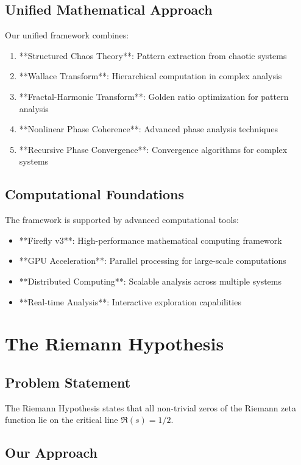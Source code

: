 \documentclass[12pt]{article}
\begin{document}
\subsection{Unified Mathematical Approach}

Our unified framework combines:
\begin{enumerate}
    \item **Structured Chaos Theory**: Pattern extraction from chaotic systems
    \item **Wallace Transform**: Hierarchical computation in complex analysis
    \item **Fractal-Harmonic Transform**: Golden ratio optimization for pattern analysis
    \item **Nonlinear Phase Coherence**: Advanced phase analysis techniques
    \item **Recursive Phase Convergence**: Convergence algorithms for complex systems
\end{enumerate}

\subsection{Computational Foundations}

The framework is supported by advanced computational tools:
\begin{itemize}
    \item **Firefly v3**: High-performance mathematical computing framework
    \item **GPU Acceleration**: Parallel processing for large-scale computations
    \item **Distributed Computing**: Scalable analysis across multiple systems
    \item **Real-time Analysis**: Interactive exploration capabilities
\end{itemize}

\section{The Riemann Hypothesis}

\subsection{Problem Statement}
The Riemann Hypothesis states that all non-trivial zeros of the Riemann zeta function lie on the critical line $\Re(s) = 1/2$.

\subsection{Our Approach}
\end{document}
